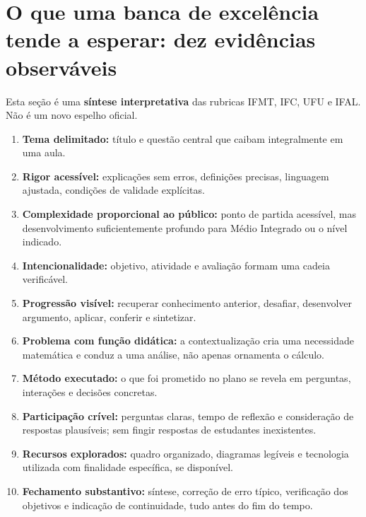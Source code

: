 \documentclass[11pt,a4paper]{article}
\begin{document}
\section{O que uma banca de excelência tende a esperar: dez evidências observáveis}
Esta seção é uma \textbf{síntese interpretativa} das rubricas IFMT, IFC, UFU e IFAL. Não é um novo espelho oficial.
\begin{enumerate}
\item \textbf{Tema delimitado:} título e questão central que caibam integralmente em uma aula.
\item \textbf{Rigor acessível:} explicações sem erros, definições precisas, linguagem ajustada, condições de validade explícitas.
\item \textbf{Complexidade proporcional ao público:} ponto de partida acessível, mas desenvolvimento suficientemente profundo para Médio Integrado ou o nível indicado.
\item \textbf{Intencionalidade:} objetivo, atividade e avaliação formam uma cadeia verificável.
\item \textbf{Progressão visível:} recuperar conhecimento anterior, desafiar, desenvolver argumento, aplicar, conferir e sintetizar.
\item \textbf{Problema com função didática:} a contextualização cria uma necessidade matemática e conduz a uma análise, não apenas ornamenta o cálculo.
\item \textbf{Método executado:} o que foi prometido no plano se revela em perguntas, interações e decisões concretas.
\item \textbf{Participação crível:} perguntas claras, tempo de reflexão e consideração de respostas plausíveis; sem fingir respostas de estudantes inexistentes.
\item \textbf{Recursos explorados:} quadro organizado, diagramas legíveis e tecnologia utilizada com finalidade específica, se disponível.
\item \textbf{Fechamento substantivo:} síntese, correção de erro típico, verificação dos objetivos e indicação de continuidade, tudo antes do fim do tempo.
\end{enumerate}
\end{document}
